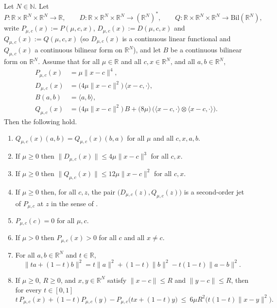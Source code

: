 \begin{lemma}[The calculus of the quartic penalty $P_{\mu,c}(x)=\mu\|x-c\|^{4}$]
Let $N\in\mathbb N$. Let
\[
 P:\mathbb R\times\mathbb R^{N}\times\mathbb R^{N}\to\mathbb R,\qquad
 D:\mathbb R\times\mathbb R^{N}\times\mathbb R^{N}\to(\mathbb R^{N})^{*},\qquad
 Q:\mathbb R\times\mathbb R^{N}\times\mathbb R^{N}\to\mathrm{Bil}(\mathbb R^{N}),
\]
write $P_{\mu,c}(x):=P(\mu,c,x)$, $D_{\mu,c}(x):=D(\mu,c,x)$ and
$Q_{\mu,c}(x):=Q(\mu,c,x)$ (so $D_{\mu,c}(x)$ is a continuous linear functional and
$Q_{\mu,c}(x)$ a continuous bilinear form on $\mathbb R^{N}$), and let $B$ be a continuous
bilinear form on $\mathbb R^{N}$. Assume that for all $\mu\in\mathbb R$ and all
$c,x\in\mathbb R^{N}$, and all $a,b\in\mathbb R^{N}$,
\begin{align}
 P_{\mu,c}(x)&=\mu\|x-c\|^{4}, \tag{H1}\\
 D_{\mu,c}(x)&=\big(4\mu\|x-c\|^{2}\big)\,\langle x-c,\cdot\rangle, \tag{H2}\\
 B(a,b)&=\langle a,b\rangle, \tag{H3}\\
 Q_{\mu,c}(x)&=\big(4\mu\|x-c\|^{2}\big)\,B
   +\big(8\mu\big)\,\big(\langle x-c,\cdot\rangle\otimes\langle x-c,\cdot\rangle\big).
 \tag{H4}
\end{align}
Then the following hold.
\begin{enumerate}
\item $Q_{\mu,c}(x)(a,b)=Q_{\mu,c}(x)(b,a)$ for all $\mu$ and all $c,x,a,b$.
\item If $\mu\ge0$ then $\|D_{\mu,c}(x)\|\le4\mu\|x-c\|^{3}$ for all $c,x$.
\item If $\mu\ge0$ then $\|Q_{\mu,c}(x)\|\le12\mu\|x-c\|^{2}$ for all $c,x$.
\item If $\mu\ge0$ then, for all $c,z$, the pair $\big(D_{\mu,c}(z),Q_{\mu,c}(z)\big)$ is a
  second-order jet of $P_{\mu,c}$ at $z$ in the sense of .
\item $P_{\mu,c}(c)=0$ for all $\mu,c$.
\item If $\mu>0$ then $P_{\mu,c}(x)>0$ for all $c$ and all $x\ne c$.
\item For all $a,b\in\mathbb R^{N}$ and $t\in\mathbb R$,
  \[
   \|t a+(1-t)b\|^{2}=t\|a\|^{2}+(1-t)\|b\|^{2}-t(1-t)\|a-b\|^{2}.
  \]
\item If $\mu\ge0$, $R\ge0$, and $x,y\in\mathbb R^{N}$ satisfy $\|x-c\|\le R$ and
  $\|y-c\|\le R$, then for every $t\in[0,1]$
  \[
   t\,P_{\mu,c}(x)+(1-t)P_{\mu,c}(y)-P_{\mu,c}\big(t x+(1-t)y\big)
    \ \le\ 6\mu R^{2}\big(t(1-t)\|x-y\|^{2}\big).
  \]
\end{enumerate}
\end{lemma}
